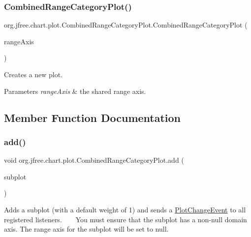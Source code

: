 \subsubsection{\texorpdfstring{Combined\+Range\+Category\+Plot()}{CombinedRangeCategoryPlot()}\hspace{0.1cm}{\footnotesize\ttfamily [2/2]}}
{\footnotesize\ttfamily org.\+jfree.\+chart.\+plot.\+Combined\+Range\+Category\+Plot.\+Combined\+Range\+Category\+Plot (\begin{DoxyParamCaption}\item[{\mbox{\hyperlink{classorg_1_1jfree_1_1chart_1_1axis_1_1_value_axis}{Value\+Axis}}}]{range\+Axis }\end{DoxyParamCaption})}

Creates a new plot.


\begin{DoxyParams}{Parameters}
{\em range\+Axis} & the shared range axis. \\
\hline
\end{DoxyParams}


\subsection{Member Function Documentation}
\mbox{\label{classorg_1_1jfree_1_1chart_1_1plot_1_1_combined_range_category_plot_a67615ef1c87fa10046f3fd2c9250f8e5}} 
\subsubsection{\texorpdfstring{add()}{add()}\hspace{0.1cm}{\footnotesize\ttfamily [1/2]}}
{\footnotesize\ttfamily void org.\+jfree.\+chart.\+plot.\+Combined\+Range\+Category\+Plot.\+add (\begin{DoxyParamCaption}\item[{\mbox{\hyperlink{classorg_1_1jfree_1_1chart_1_1plot_1_1_category_plot}{Category\+Plot}}}]{subplot }\end{DoxyParamCaption})}

Adds a subplot (with a default \textquotesingle{}weight\textquotesingle{} of 1) and sends a \mbox{\hyperlink{}{Plot\+Change\+Event}} to all registered listeners. ~\newline
~\newline
 You must ensure that the subplot has a non-\/null domain axis. The range axis for the subplot will be set to {\ttfamily null}.


